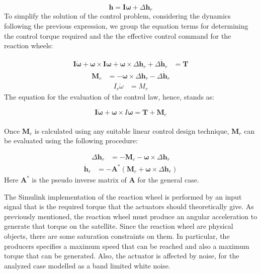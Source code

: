     \begin{equation*}
		\mathbf{h} = \boldsymbol{I} \boldsymbol{\omega} + \Delta \mathbf{h}_r
    \end{equation*}	
To simplify the solution of the control problem, considering the dynamics following the previous expression, we group the equation terms for determining the control torque required and the the effective control command for the reaction wheels:

	\begin{align*}
	\boldsymbol{I} \dot{\boldsymbol{\omega}} + \boldsymbol{\omega} \times \boldsymbol{I} \boldsymbol{\omega} + \boldsymbol{\omega} \times \Delta \mathbf{h}_r + \Delta \dot{\mathbf{h}}_r &= \mathbf{T} 
	\end{align*}
	\begin{align*}
		\mathbf{M}_c &= -\boldsymbol{\omega} \times \Delta \mathbf{h}_r - \Delta \dot{\mathbf{h}}_r
	\end{align*}
	\begin{align*}
			I_r \dot{{\omega}} &= {M}_r 
	\end{align*}
The equation for the evaluation of the control law, hence, stands as:
	
	\begin{equation*}
		\boldsymbol{I} \dot{\boldsymbol{\omega}} + \boldsymbol{\omega} \times I \boldsymbol{\omega} = \mathbf{T} + \mathbf{M}_c
	\end{equation*}\\
Once \( \mathbf{M}_c \) is calculated using any suitable linear control design technique,  \( \mathbf{M}_r \) can be evaluated using the following procedure:
	
	\begin{align*}
		\Delta \mathbf{h}_r &= -\mathbf{M}_c - \boldsymbol{\omega} \times \Delta \mathbf{h}_r 
	\end{align*}
	\begin{align*}
	\dot{\mathbf{h}}_r &= -\mathbf{A}^* ( \mathbf{M}_c + \boldsymbol{\omega} \times \Delta \mathbf{h}_r )
    \end{align*}
Here \( \mathbf{A}^* \) is the pseudo inverse matrix of \( \mathbf{A} \) for the general case.

The Simulink implementation of the reaction wheel is performed by an input signal that is the required torque that the actuators should theoretically give. As previously mentioned, the reaction wheel must produce an angular acceleration to generate that torque on the satellite. Since the reaction wheel are physical objects, there are some saturation constraints on them. In particular, the producers specifies a maximum speed that can be reached and also a maximum torque that can be generated. Also, the actuator is affected by noise, for the analyzed case modelled as a band limited white noise. 

